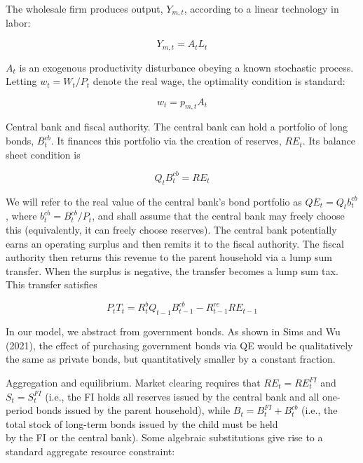 \documentclass[10pt]{article}
\begin{document}
The wholesale firm produces output, $Y_{m, t}$, according to a linear technology in labor:

\begin{equation*}
Y_{m, t}=A_{t} L_{t} \tag{26}
\end{equation*}

$A_{t}$ is an exogenous productivity disturbance obeying a known stochastic process. Letting $w_{t}=W_{t} / P_{t}$ denote the real wage, the optimality condition is standard:

\begin{equation*}
w_{t}=p_{m, t} A_{t} \tag{27}
\end{equation*}

Central bank and fiscal authority. The central bank can hold a portfolio of long bonds, $B_{t}^{c b}$. It finances this portfolio via the creation of reserves, $R E_{t}$. Its balance sheet condition is

\begin{equation*}
Q_{t} B_{t}^{c b}=R E_{t} \tag{28}
\end{equation*}

We will refer to the real value of the central bank's bond portfolio as $Q E_{t}=Q_{t} b_{t}^{c b}$, where $b_{t}^{c b}=B_{t}^{c b} / P_{t}$, and shall assume that the central bank may freely choose this (equivalently, it can freely choose reserves). The central bank potentially earns an operating surplus and then remits it to the fiscal authority. The fiscal authority then returns this revenue to the parent household via a lump sum transfer. When the surplus is negative, the transfer becomes a lump sum tax. This transfer satisfies

\begin{equation*}
P_{t} T_{t}=R_{t}^{b} Q_{t-1} B_{t-1}^{c b}-R_{t-1}^{r e} R E_{t-1} \tag{29}
\end{equation*}

In our model, we abstract from government bonds. As shown in Sims and Wu (2021), the effect of purchasing government bonds via QE would be qualitatively the same as private bonds, but quantitatively smaller by a constant fraction.

Aggregation and equilibrium. Market clearing requires that $R E_{t}=R E_{t}^{F I}$ and $S_{t}=S_{t}^{F I}$ (i.e., the FI holds all reserves issued by the central bank and all one-period bonds issued by the parent household), while $B_{t}=B_{t}^{F I}+B_{t}^{c b}$ (i.e., the total stock of long-term bonds issued by the child must be held\\
by the FI or the central bank). Some algebraic substitutions give rise to a standard aggregate resource constraint:
\end{document}
